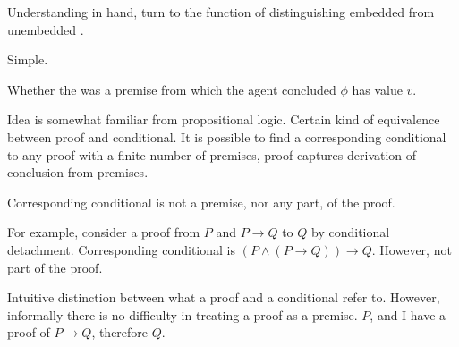 \begin{note}
  Understanding in hand, turn to the function of distinguishing embedded from unembedded \ros{}.

  Simple.

  Whether the \ros{} was a premise from which the agent concluded \(\phi\) has value \(v\).
\end{note}

\begin{note}
  Idea is somewhat familiar from propositional logic.
  Certain kind of equivalence between proof and conditional.
  It is possible to find a corresponding conditional to any proof with a finite number of premises, proof captures derivation of conclusion from premises.

  Corresponding conditional is not a premise, nor any part, of the proof.

  For example, consider a proof from \(P\) and \(P \rightarrow Q\) to \(Q\) by conditional detachment.
  Corresponding conditional is \((P \land (P \rightarrow Q)) \rightarrow Q\).
  However, not part of the proof.

  Intuitive distinction between what a proof and a conditional refer to.
  However, informally there is no difficulty in treating a proof as a premise.
  \(P\), and I have a proof of \(P \rightarrow Q\), therefore \(Q\).
\end{note}

